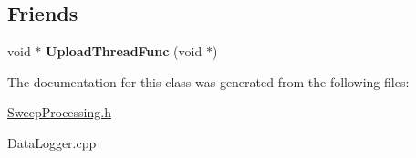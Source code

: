 \subsection*{Friends}
\begin{DoxyCompactItemize}
\item 
\mbox{\label{classDataLogger_a0cabdadaf836f897a111e72ab29d42f6}} 
void $\ast$ {\bfseries Upload\+Thread\+Func} (void $\ast$)
\end{DoxyCompactItemize}


The documentation for this class was generated from the following files\+:\begin{DoxyCompactItemize}
\item 
\hyperlink{SweepProcessing_8h}{Sweep\+Processing.\+h}\item 
Data\+Logger.\+cpp\end{DoxyCompactItemize}
